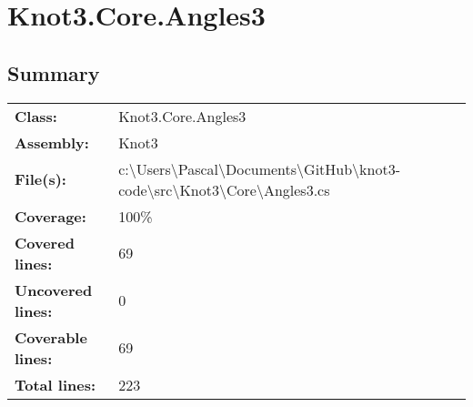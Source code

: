 \documentclass[a4paper,10pt]{article}
\begin{document}
\section{Knot3.Core.Angles3}
\subsection{Summary}
\begin{longtable}[l]{ll}
\textbf{Class:} & Knot3.Core.Angles3\\
\textbf{Assembly:} & Knot3\\
\textbf{File(s):} & \begin{minipage}[t]{12cm}{c:\textbackslash Users\textbackslash Pascal\textbackslash Documents\textbackslash GitHub\textbackslash knot3-code\textbackslash src\textbackslash Knot3\textbackslash Core\textbackslash Angles3.cs}\end{minipage} \\
\textbf{Coverage:} & 100\%\\
\textbf{Covered lines:} & 69\\
\textbf{Uncovered lines:} & 0\\
\textbf{Coverable lines:} & 69\\
\textbf{Total lines:} & 223\\
\end{longtable}
\end{document}
